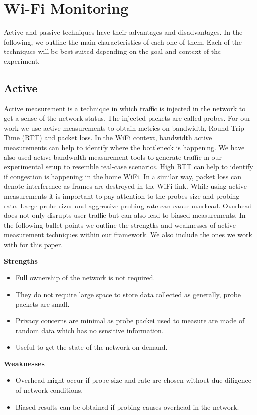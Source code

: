 \section{Wi-Fi Monitoring}\label{Wireless Monitoring Metrics}

 Active and passive techniques have their advantages and disadvantages. In the following, we outline the main characteristics of each one of them. Each of the techniques will be best-suited depending on the  goal and context of the experiment.

\subsection{Active}

Active measurement is a technique in which traffic is injected in the network to get a sense of the network status. The injected packets are called probes. For our work we use active measurements to obtain metrics on bandwidth, Round-Trip Time (RTT) and packet loss. In the WiFi context, bandwidth active measurements can help to identify where the bottleneck is happening. We have also used active bandwidth measurement tools to generate traffic in our experimental setup to resemble real-case scenarios. High RTT can help to identify if congestion is happening in the home WiFi. In a similar way, packet loss can denote interference as frames are destroyed in the WiFi link. While using active measurements it is  important to pay attention to the probes size and probing rate. Large probe sizes and aggressive probing rate can cause overhead. Overhead does not only disrupts user traffic but can also lead to biased measurements. In the following bullet points we outline the strengths and weaknesses of active measurement techniques within our framework. We also include the ones we work with for this paper.


\textbf{Strengths}
\begin{itemize}
	\item Full ownership of the network is not required.
	\item They do not require large space to store data collected as generally, probe packets are small.
	\item Privacy concerns are minimal as probe packet used to measure are made of random data which has no sensitive information.
	\item Useful to get the state of the network on-demand.
\end{itemize}
	

\textbf{Weaknesses}
\begin{itemize}
	\item Overhead might occur if probe size and rate are chosen without due diligence of network conditions.
	\item Biased results can be obtained if probing causes overhead in the network.
\end{itemize}


